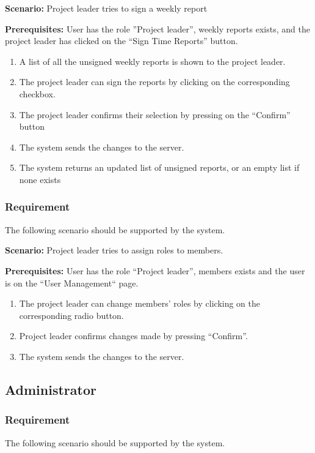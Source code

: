 \documentclass{article}
\begin{document}
\textbf{Scenario:} Project leader tries to sign a weekly report

\textbf{Prerequisites:} User has the role ”Project leader”, weekly reports exists, and the project leader has clicked on the “Sign Time Reports” button.

\begin{enumerate}
    \item A list of all the unsigned weekly reports is shown to the project leader.
    \item The project leader can sign the reports by clicking on the corresponding checkbox.
    \item The project leader confirms their selection by pressing on the “Confirm” button
    \item The system sends the changes to the server.
    \item The system returns an updated list of unsigned reports, or an empty list if none exists
\end{enumerate}

\subsubsection{Requirement}
The following scenario should be supported by the system.

\textbf{Scenario:} Project leader tries to assign roles to members.

\textbf{Prerequisites:} User has the role “Project leader”, members exists and the user is on the “User Management“ page.

\begin{enumerate}
    \item The project leader can change members' roles by clicking on the corresponding radio button.
    \item Project leader confirms changes made by pressing “Confirm”.
    \item The system sends the changes to the server.
    
\end{enumerate}

\subsection{Administrator}
\subsubsection{Requirement}
The following scenario should be supported by the system.
\end{document}
